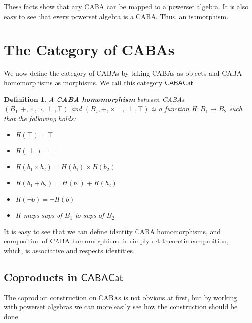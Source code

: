 \documentclass{article}
\newtheorem{definition}[thm]{Definition}
\newcommand{\CABAC}[0]{\mathsf{CABACat}}
\begin{document}
These facts show that any CABA can be mapped to a powerset algebra. It
is also easy to see that every powerset algebra is a CABA. Thus, an
isomorphism.  

\section{The Category of CABAs}
\label{sec:the_category_of_cabas}
We now define the category of CABAs by taking CABAs as objects and
CABA homomorphisms as morphisms.  We call this category
$\CABAC$.
\vspace{10px}
\begin{definition}
  \label{def:caba-morph}
  A \textbf{CABA homomorphism} between CABAs
  $(B_1,+,\times,\lnot,\perp,\top)$ and
  $(B_2,+,\times,\lnot,\perp,\top)$ is a function $H : B_1 \to B_2$
  such that the following holds:
  \begin{itemize}
  \item[1.] $H(\top) = \top$
  \item[2.] $H(\perp) = \perp$
  \item[3.] $H(b_1 \times b_2) = H(b_1) \times H(b_2)$
  \item[4.] $H(b_1 + b_2) = H(b_1) + H(b_2)$
  \item[5.] $H(\lnot b) = \lnot H(b)$
  \item[6.] $H$ maps sups of $B_1$ to sups of $B_2$
  \end{itemize}  
\end{definition}
It is easy to see that we can define identity CABA homomorphisms, and
composition of CABA homomorphisms is simply set theoretic
composition, which, is associative and respects identities.

\subsection{Coproducts in $\CABAC$}
\label{subsec:coproducts_in_cabac}
The coproduct construction on CABAs is not obvious at first, but by
working with powerset algebras we can more easily see how the
construction should be done.
\end{document}
